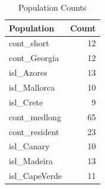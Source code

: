 \begin{table}[ht]
\centering
\caption{Population Counts}
\label{tab:population_counts}
\begin{tabular}{lr}
\hline
Population & Count \\
\hline
cont_short & 12 \\
cont_Georgia & 12 \\
isl_Azores & 13 \\
isl_Mallorca & 10 \\
isl_Crete & 9 \\
cont_medlong & 65 \\
cont_resident & 23 \\
isl_Canary & 10 \\
isl_Madeira & 13 \\
isl_CapeVerde & 11 \\
\hline
\end{tabular}
\end{table}
